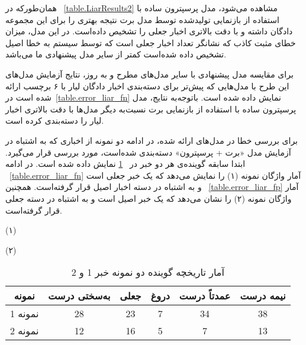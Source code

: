 همان‌طورکه در \tablename~\ref{table.LiarResults2}  مشاهده می‌شود، مدل پرسپترون ساده با استفاده از بازنمایی تولیدشده توسط مدل برت نتیجه بهتری را برای این مجموعه دادگان داشته‌ و با دقت بالاتری اخبار جعلی را تشخیص داده‌است.  در این مدل، میزان خطای مثبت کاذب که نشانگر تعداد اخبار جعلی است که توسط سیستم به خطا اصیل تشخیص داده شده‌است کمتر از سایر مدل پیشنهادی ما می‌باشد.

برای مقایسه مدل پیشنهادی با سایر مدل‌های مطرح و به‌ روز، نتایج آزمایش مدل‌های این طرح با مدل‌هایی که پیش‌تر برای دسته‌بندی اخبار دادگان لیار با ۶ برچسب ارائه شده‌ است در\tablename~\ref{table.error_liar_fn} نمایش داده شده‌ است.  باتوجه‌به نتایج، مدل پرسپترون ساده با استفاده از بازنمایی برت نسبت‌به دیگر مدل‌ها با دقت بالاتری اخبار لیار را دسته‌بندی کرده ‌است.

برای بررسی خطا در مدل‌های ارائه شده، در ادامه دو نمونه از اخباری که به اشتباه در آزمایش مدل «برت + پرسپترون» دسته‌بندی شده‌است، مورد بررسی قرار می‌گیرد. ابتدا سابقه گوینده‌ی هر دو خبر در  \tablename~\ref{table.error_history_liar_fn}  نمایش داده شده‌ است.  در ادامه  \tablename~\ref{table.error_liar_fn}   آمار واژگان نمونه  (۱)   را نمایش می‌دهد که یک خبر جعلی است و به اشتباه در دسته اخبار اصیل قرار گرفته‌است. همچنین  \tablename~\ref{table.error_liar_fp}   آمار واژگان نمونه  (۲)   را نشان می‌دهد که یک خبر اصیل است و به اشتباه در دسته جعلی قرار گرفته‌است. 



(۱)\\
\begin{flushleft}\end{flushleft}

(۲)\\
\begin{flushleft}\end{flushleft}

\begin{table}[!h]
	\caption{آمار تاریخچه گوینده دو نمونه خبر  1  و  2 }
	\label{table.error_history_liar_fn}
	\begin{center}
		\begin{tabular}{|c|c|c|c|c|c|}
			\hline
			نمونه & به‌سختی درست & جعلی & دروغ & عمدتاً درست & نیمه درست \\
			\hline
			\hline
			نمونه  1  & 28 & 23 & 7 & 34 & 38 \\ \hline
			نمونه  2  & 12 & 16 & 5 & 7 & 13 \\ \hline
		\end{tabular}
	\end{center}
\end{table}


